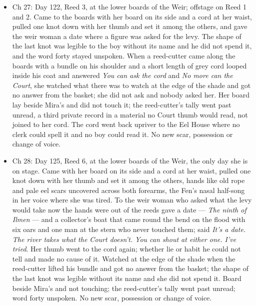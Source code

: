 \documentclass{design/chronicle}
\begin{document}
{\begin{itemize}[leftmargin=1.4em,itemsep=1pt,topsep=3pt,parsep=0pt]
\item Ch 27: Day 122, Reed 3, at the lower boards of the Weir; offstage on Reed 1 and 2. Came to the boards with her board on its side and a cord at her waist, pulled one knot down with her thumb and set it among the others, and gave the weir woman a date where a figure was asked for the levy. The shape of the last knot was legible to the boy without its name and he did not spend it, and the word forty stayed unspoken. When a reed-cutter came along the boards with a bundle on his shoulder and a short length of grey cord looped inside his coat and answered \emph{You can ask the cord} and \emph{No more can the Court}, she watched what there was to watch at the edge of the shade and got no answer from the basket; she did not ask and nobody asked her. Her board lay beside Mira’s and did not touch it; the reed-cutter’s tally went past unread, a third private record in a material no Court thumb would read, not joined to her cord. The cord went back upriver to the Eel House where no clerk could spell it and no boy could read it. No new scar, possession or change of voice.

\end{itemize}

\begin{itemize}[leftmargin=1.4em,itemsep=1pt,topsep=3pt,parsep=0pt]

\item Ch 28: Day 125, Reed 6, at the lower boards of the Weir, the only day she is on stage. Came with her board on its side and a cord at her waist, pulled one knot down with her thumb and set it among the others, hands like old rope and pale eel scars uncovered across both forearms, the Fen’s nasal half-song in her voice where she was tired. To the weir woman who asked what the levy would take now the hands were out of the reeds gave a date — \emph{The ninth of Ilmen} — and a collector’s boat that came round the bend on the flood with six oars and one man at the stern who never touched them; said \emph{It’s a date. The river takes what the Court doesn’t. You can shout at either one. I’ve tried}. Her thumb went to the cord again; whether lie or habit he could not tell and made no cause of it. Watched at the edge of the shade when the reed-cutter lifted his bundle and got no answer from the basket; the shape of the last knot was legible without its name and she did not spend it. Board beside Mira’s and not touching; the reed-cutter’s tally went past unread; word forty unspoken. No new scar, possession or change of voice.


\end{itemize}}
\end{document}
